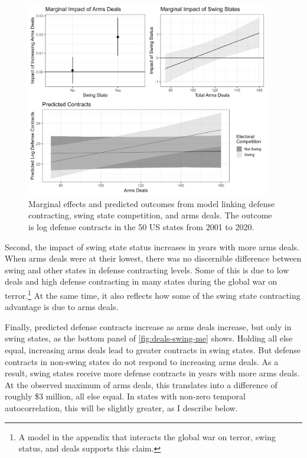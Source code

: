 \documentclass[12pt]{article}
\begin{document}
\begin{figure}[htpb]
	\centering
		\includegraphics[width=0.95\textwidth]{../figures/deals-swing-me.png}
	\caption{Marginal effects and predicted outcomes from model linking defense contracting, swing state competition, and arms deals. The outcome is log defense contracts in the 50 US states from 2001 to 2020. }
	\label{fig:deals-swing-me}
\end{figure}


Second, the impact of swing state status increases in years with more arms deals. 
When arms deals were at their lowest, there was no discernible difference between swing and other states in defense contracting levels. 
Some of this is due to low deals and high defense contracting in many states during the global war on terror.\footnote{A model in the appendix that interacts the global war on terror, swing status, and deals supports this claim.}
At the same time, it also reflects how some of the swing state contracting advantage is due to arms deals. 


Finally, predicted defense contracts increase as arms deals increase, but only in swing states, as the bottom panel of \autoref{fig:deals-swing-me} shows. 
Holding all else equal, increasing arms deals lead to greater contracts in swing states. 
But defense contracts in non-swing states do not respond to increasing arms deals.
As a result, swing states receive more defense contracts in years with more arms deals. 
At the observed maximum of arms deals, this translates into a difference of roughly \$3 million, all else equal. 
In states with non-zero temporal autocorrelation, this will be slightly greater, as I describe below. 
\end{document}
